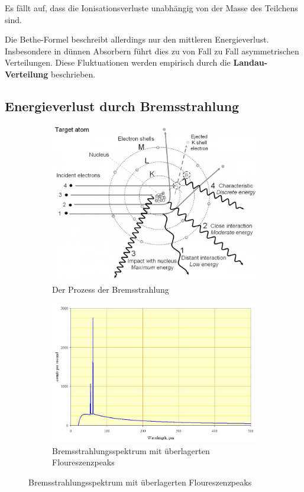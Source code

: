 Es fällt auf, dass die Ionisationsverluste unabhängig von der Masse des Teilchens sind.

Die Bethe-Formel beschreibt allerdings nur den mittleren Energieverlust.
Insbesondere in dünnen Absorbern führt dies zu von Fall zu Fall asymmetrischen Verteilungen.
Diese Fluktuationen werden empirisch durch die \textbf{Landau-Verteilung} beschrieben.

\subsection{Energieverlust durch Bremsstrahlung}
\begin{figure}
	\centering
	\begin{subfigure}{0.4\textwidth}
		\centering
		\includegraphics[width=\textwidth]{./img/elatom.jpg}
		\caption{Der Prozess der Bremsstrahlung}
		\label{fig:elatom}
	\end{subfigure}
	\begin{subfigure}{0.4\textwidth}
		\centering
		\includegraphics[width=\textwidth]{./img/bremsspec.jpg}
		\caption{Bremsstrahlungsspektrum mit überlagerten Floureszenzpeaks}
		\label{fig:bremsspec}
	\end{subfigure}
\end{figure}

